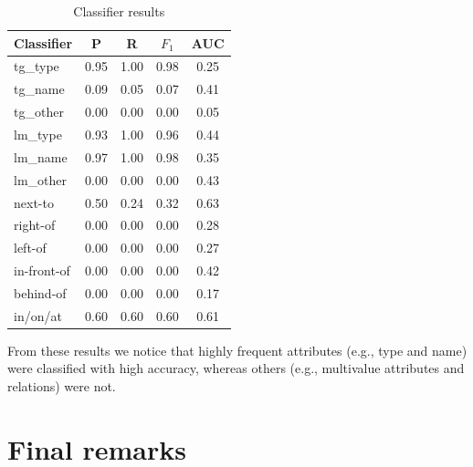\documentclass{article}
\begin{document}
\begin{table}[ht]
\begin{center}
\footnotesize{
\caption{Classifier results}
\begin{tabular}{l c c c c }
\hline
{{Classifier}}	& {P} & {R} & {$F_{1}$} & {AUC} \\
\hline
{{tg\_type}} 			& 0.95 & 1.00 & 0.98 & 0.25 \\
{{tg\_name}}			& 0.09 & 0.05 & 0.07 & 0.41 \\
{{tg\_other}}			& 0.00 & 0.00 & 0.00 & 0.05 \\                               
{{lm\_type}}			& 0.93 & 1.00 & 0.96 & 0.44 \\                               
{{lm\_name}}			& 0.97 & 1.00 & 0.98 & 0.35 \\                               
{{lm\_other}}			& 0.00 & 0.00 & 0.00 & 0.43 \\                               
{{next-to}}				& 0.50 & 0.24 & 0.32 & 0.63 \\                               
{{right-of}}			& 0.00 & 0.00 & 0.00 & 0.28 \\                               
{{left-of}}				& 0.00 & 0.00 & 0.00 & 0.27 \\                               
{{in-front-of}}		& 0.00 & 0.00 & 0.00 & 0.42 \\                               
{{behind-of}}			& 0.00 & 0.00 & 0.00 & 0.17 \\                               
{{in/on/at}} 			& 0.60 & 0.60 & 0.60 & 0.61 \\                               
\hline                   
\end{tabular}
\label{tab-svm-results}
}
\end{center}
\end{table}
\normalsize

From these results we notice that highly frequent attributes (e.g., type and name) were classified  with high accuracy, whereas others (e.g., multivalue attributes and relations) were not. 



\section{Final remarks}
\label{sec-final}
\end{document}
